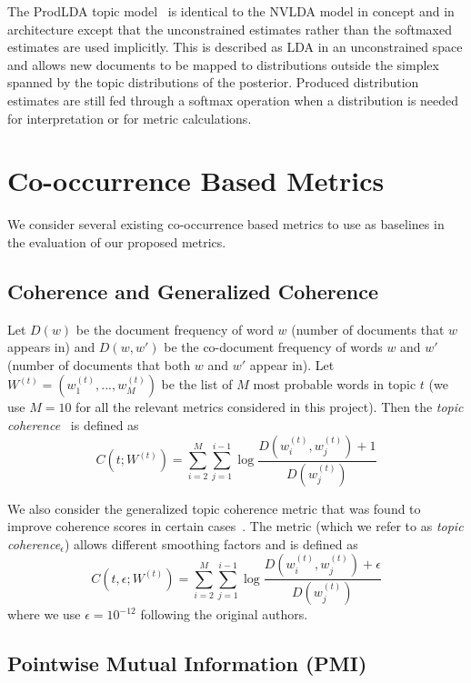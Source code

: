 \documentclass[10pt]{article}
\begin{document}
The ProdLDA topic model~\cite{Srivastava:2017} is identical to the NVLDA model in concept and in architecture except that the unconstrained estimates rather than the softmaxed estimates are used implicitly. This is described as LDA in an unconstrained space and allows new documents to be mapped to distributions outside the simplex spanned by the topic distributions of the posterior. Produced distribution estimates are still fed through a softmax operation when a distribution is needed for interpretation or for metric calculations.

\section{Co-occurrence Based Metrics}

We consider several existing co-occurrence based metrics to use as baselines in the evaluation of our proposed metrics.

\subsection{Coherence and Generalized Coherence}

Let $D(w)$ be the document frequency of word $w$ (number of documents that $w$ appears in) and $D(w,w')$ be the co-document frequency of words $w$ and $w'$ (number of documents that both $w$ and $w'$ appear in). Let $W^{(t)}=\left(w_1^{(t)},...,w_M^{(t)}\right)$ be the list of $M$ most probable words in topic $t$ (we use $M=10$ for all the relevant metrics considered in this project). Then the \textit{topic coherence}~\cite{Mimno:2011} is defined as
\[
C\left(t;W^{(t)}\right)=\sum_{i=2}^M\sum_{j=1}^{i-1}\log\frac{D\left(w_i^{(t)},w_j^{(t)}\right)+1}{D\left(w_j^{(t)}\right)}
\]

We also consider the generalized topic coherence metric that was found to improve coherence scores in certain cases~\cite{Stevens:2012}. The metric (which we refer to as \textit{topic coherence$_\epsilon$}) allows different smoothing factors and is defined as
\[
C\left(t,\epsilon;W^{(t)}\right)=\sum_{i=2}^M\sum_{j=1}^{i-1}\log\frac{D\left(w_i^{(t)},w_j^{(t)}\right)+\epsilon}{D\left(w_j^{(t)}\right)}
\]
where we use $\epsilon=10^{-12}$ following the original authors.

\subsection{Pointwise Mutual Information (PMI)}
\end{document}
